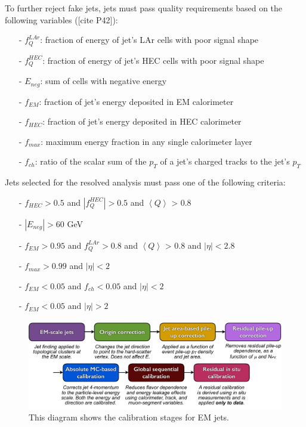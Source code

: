 To further reject fake jets, jets must pass quality requirements based on the following variables ([cite P42]):

\begin{itemize}
\item[-] $f_{Q}^{LAr}$: fraction of energy of jet's LAr cells with poor signal shape
\item[-] $f_{Q}^{HEC}$: fraction of energy of jet's HEC cells with poor signal shape
\item[-] $E_{neg}$: sum of cells with negative energy
\item[-] $f_{EM}$: fraction of jet's energy deposited in EM calorimeter
\item[-] $f_{HEC}$: fraction of jet's energy deposited in HEC calorimeter
\item[-] $f_{max}$: maximum energy fraction in any single calorimeter layer
\item[-] $f_{ch}$: ratio of the scalar sum of the $p_{T}$ of a jet's charged tracks to the jet's $p_{T}$
\end{itemize}

Jets selected for the resolved analysis must pass one of the following criteria:

\begin{itemize}
\item[-] $f_{HEC} > 0.5$ and $|f_{Q}^{HEC}| > 0.5$ and $\left\langle Q \right\rangle $ > 0.8
\item[-] $|E_{neg}| > 60$ GeV
\item[-] $f_{EM} > 0.95$ and $f_{Q}^{LAr} > 0.8$ and $\left\langle Q \right\rangle $ > 0.8 and $|\eta| < 2.8$
\item[-] $f_{max} > 0.99$ and $|\eta| < 2$
\item[-] $f_{EM} < 0.05$ and $f_{ch} < 0.05$ and $|\eta| < 2$
\item[-] $f_{EM} < 0.05$ and  $|\eta| > 2$
\end{itemize}



\begin{figure}[h!]
  \centering
  \includegraphics[width=\hsize]{figures/Analysis/jetcalib.pdf}
  \caption{\cite{jetcalib} This diagram shows the calibration stages for EM jets.} 
  \label{fig:jetcalib}
\end{figure} 
\FloatBarrier




